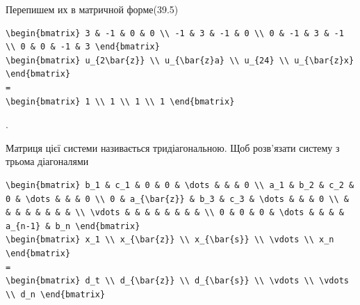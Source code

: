 \documentclass[
  ukrainian,
]{article}
\begin{document}
Перепишем их в матричной форме(39.5)

\begin{verbatim}
\begin{bmatrix} 3 & -1 & 0 & 0 \\ -1 & 3 & -1 & 0 \\ 0 & -1 & 3 & -1 \\ 0 & 0 & -1 & 3 \end{bmatrix}
\begin{bmatrix} u_{2\bar{z}} \\ u_{\bar{z}a} \\ u_{24} \\ u_{\bar{z}x} \end{bmatrix}
=
\begin{bmatrix} 1 \\ 1 \\ 1 \\ 1 \end{bmatrix}
\end{verbatim}

.

Матриця цієї системи називається тридіагональною. Щоб розв'язати систему
з трьома діагоналями

\begin{verbatim}
\begin{bmatrix} b_1 & c_1 & 0 & 0 & \dots & & & 0 \\ a_1 & b_2 & c_2 & 0 & \dots & & & 0 \\ 0 & a_{\bar{z}} & b_3 & c_3 & \dots & & & 0 \\ & & & & & & & & \\ \vdots & & & & & & & & \\ 0 & 0 & 0 & \dots & & & & a_{n-1} & b_n \end{bmatrix}
\begin{bmatrix} x_1 \\ x_{\bar{z}} \\ x_{\bar{s}} \\ \vdots \\ x_n \end{bmatrix}
=
\begin{bmatrix} d_t \\ d_{\bar{z}} \\ d_{\bar{s}} \\ \vdots \\ \vdots \\ d_n \end{bmatrix}
\end{verbatim}
\end{document}
